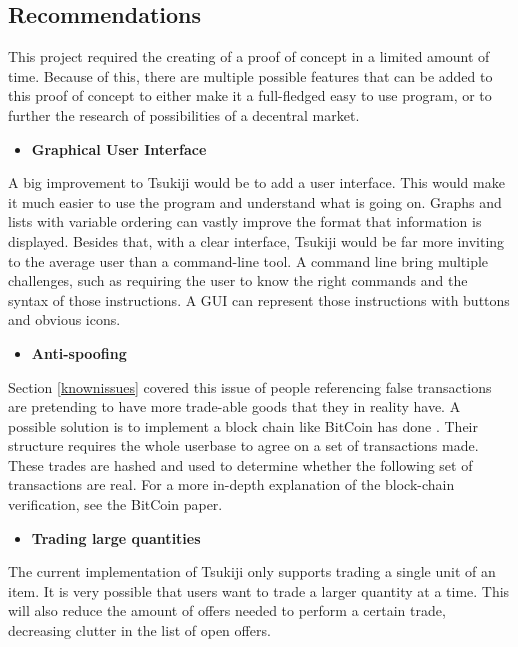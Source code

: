 \subsection{Recommendations}
\label{recommendations}
This project required the creating of a proof of concept in a limited amount of time.
Because of this, there are multiple possible features that can be added to this proof of concept to either make it a full-fledged easy to use program, or to further the research of possibilities of a decentral market.

\begin{itemize}
\item \textbf{Graphical User Interface}
\end{itemize}
A big improvement to Tsukiji would be to add a user interface. 
This would make it much easier to use the program and understand what is going on.
Graphs and lists with variable ordering can vastly improve the format that information is displayed.
Besides that, with a clear interface, Tsukiji would be far more inviting to the average user than a command-line tool.
A command line bring multiple challenges, such as requiring the user to know the right commands and the syntax of those instructions.
A GUI can represent those instructions with buttons and obvious icons.

\begin{itemize}
\item \textbf{Anti-spoofing}
\end{itemize}
Section \ref{knownissues} covered this issue of people referencing false transactions are pretending to have more trade-able goods that they in reality have.
A possible solution is to implement a block chain like BitCoin has done \cite{bitcoin}.
Their structure requires the whole userbase to agree on a set of transactions made.
These trades are hashed and used to determine whether the following set of transactions are real.
For a more in-depth explanation of the block-chain verification, see the BitCoin paper.
\begin{itemize}
\item \textbf{Trading large quantities}
\end{itemize}
The current implementation of Tsukiji only supports trading a single unit of an item.
It is very possible that users want to trade a larger quantity at a time.
This will also reduce the amount of offers needed to perform a certain trade, decreasing clutter in the list of open offers.

